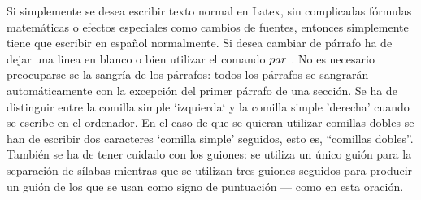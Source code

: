 \documentclass[a4paper,10pt]{letter}
\begin{document}
Si simplemente se desea escribir texto normal en Latex,
sin complicadas fórmulas matemáticas o efectos especiales
como cambios de fuentes, entonces simplemente tiene que escribir
en español normalmente.
Si desea cambiar de párrafo ha de dejar una linea en blanco o bien
utilizar el comando $\\par$ .
No es necesario preocuparse se la sangría de los párrafos:
todos los párrafos se sangrarán automáticamente con la excepción
del primer párrafo de una sección.
Se ha de distinguir entre la comilla simple `izquierda`
y la comilla simple 'derecha' cuando se escribe en el ordenador.
En el caso de que se quieran utilizar comillas dobles se han de 
escribir dos caracteres `comilla simple' seguidos, esto es, 
``comillas dobles''.
También se ha de tener cuidado con los guiones: se utiliza un único
guión para la separación de sílabas mientras que se utilizan
tres guiones seguidos para producir un guión de los que se usan
como signo de puntuación --- como en esta oración.
\end{document}
